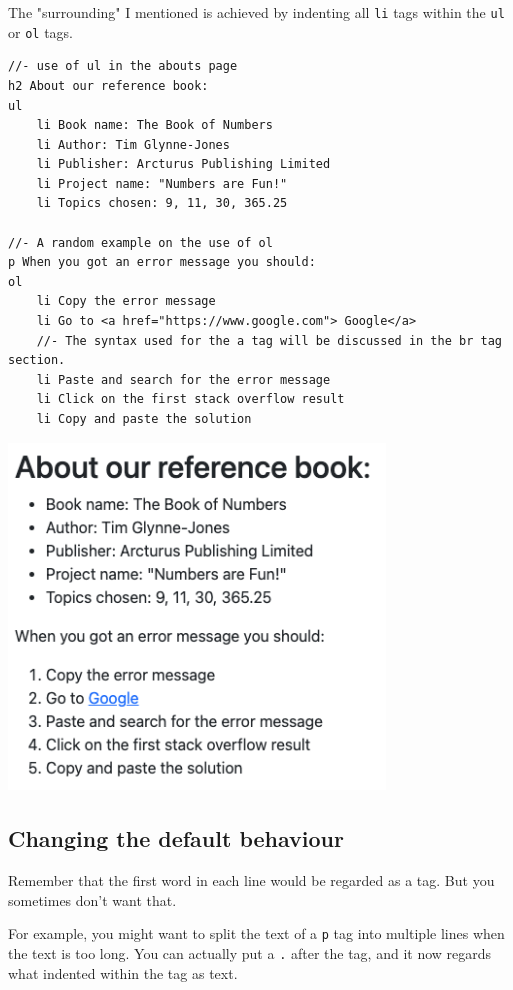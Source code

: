 The "surrounding" I mentioned is achieved by indenting all \texttt{li} tags within the \texttt{ul} or \texttt{ol} tags.
\vspace{6mm}

\begin{lstlisting}[language=pug]
//- use of ul in the abouts page
h2 About our reference book:
ul
    li Book name: The Book of Numbers
    li Author: Tim Glynne-Jones
    li Publisher: Arcturus Publishing Limited
    li Project name: "Numbers are Fun!"
    li Topics chosen: 9, 11, 30, 365.25
    
//- A random example on the use of ol
p When you got an error message you should:
ol
    li Copy the error message
    li Go to <a href="https://www.google.com"> Google</a>
    //- The syntax used for the a tag will be discussed in the br tag section.
    li Paste and search for the error message
    li Click on the first stack overflow result
    li Copy and paste the solution
\end{lstlisting}

\includegraphics[width=10cm]{images/ch5-ulol.png}

\subsection*{Changing the default behaviour}

Remember that the first word in each line would be regarded as a tag. But you sometimes don't want that. 
\vspace{6mm}

For example, you might want to split the text of a \texttt{p} tag into multiple lines when the text is too long. You can actually put a \texttt{.} after the tag, and it now regards what indented within the tag as text.

